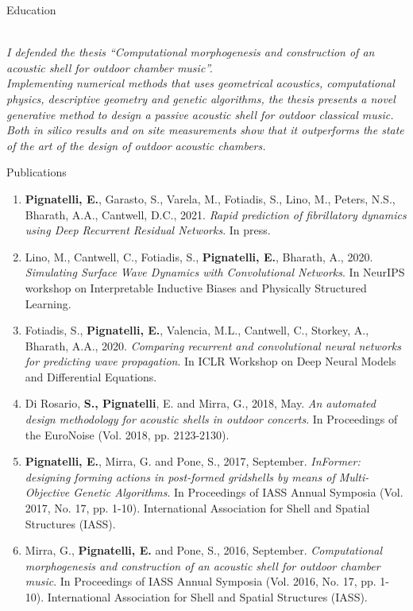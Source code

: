 \documentclass{resume}
\begin{document}
\begin{rSection}{Education}
\begin{enumerate}[leftmargin=0.45cm, itemsep=1em, topsep=0.5em, parsep=0.2em]
        \vspace{0.5em} \\
        \textit{I defended the thesis “Computational morphogenesis and construction of an acoustic shell for outdoor chamber music”. \\Implementing numerical methods that uses geometrical acoustics, computational physics, descriptive geometry and genetic algorithms, the thesis presents a novel generative method to design a passive acoustic shell for outdoor classical music. Both in silico results and on site measurements show that it outperforms the state of the art of the design of outdoor acoustic chambers.}
    \end{enumerate}
\end{rSection}

\begin{rSection}{Publications}
    \begin{enumerate}[leftmargin=0.45cm, itemsep=0em, topsep=0.5em, parsep=0.2em]
        \item \textbf{Pignatelli, E.}, Garasto, S., Varela, M., Fotiadis, S., Lino, M., Peters, N.S., Bharath, A.A., Cantwell, D.C., 2021. \textit{Rapid prediction of fibrillatory dynamics using Deep Recurrent Residual Networks}. In press.
        \item Lino, M., Cantwell, C., Fotiadis, S., \textbf{Pignatelli, E.}, Bharath, A., 2020. \textit{Simulating Surface Wave Dynamics with Convolutional Networks}. In NeurIPS workshop on Interpretable Inductive Biases and Physically Structured Learning.
        \item Fotiadis, S., \textbf{Pignatelli, E.}, Valencia, M.L., Cantwell, C., Storkey, A., Bharath, A.A., 2020. \textit{Comparing recurrent and convolutional neural networks for predicting wave propagation}. In ICLR Workshop on Deep Neural Models and Differential Equations.	
        \item Di Rosario, \textbf{S., Pignatelli}, E. and Mirra, G., 2018, May. \textit{An automated design methodology for acoustic shells in outdoor concerts}. In Proceedings of the EuroNoise (Vol. 2018, pp. 2123-2130).
        \item \textbf{Pignatelli, E.}, Mirra, G. and Pone, S., 2017, September. \textit{InFormer: designing forming actions in post-formed gridshells by means of Multi-Objective Genetic Algorithms}. In Proceedings of IASS Annual Symposia (Vol. 2017, No. 17, pp. 1-10). International Association for Shell and Spatial Structures (IASS).
        \item Mirra, G., \textbf{Pignatelli, E.} and Pone, S., 2016, September. \textit{Computational morphogenesis and construction of an acoustic shell for outdoor chamber music}. In Proceedings of IASS Annual Symposia (Vol. 2016, No. 17, pp. 1-10). International Association for Shell and Spatial Structures (IASS).

\end{enumerate}
\end{rSection}
\end{document}
